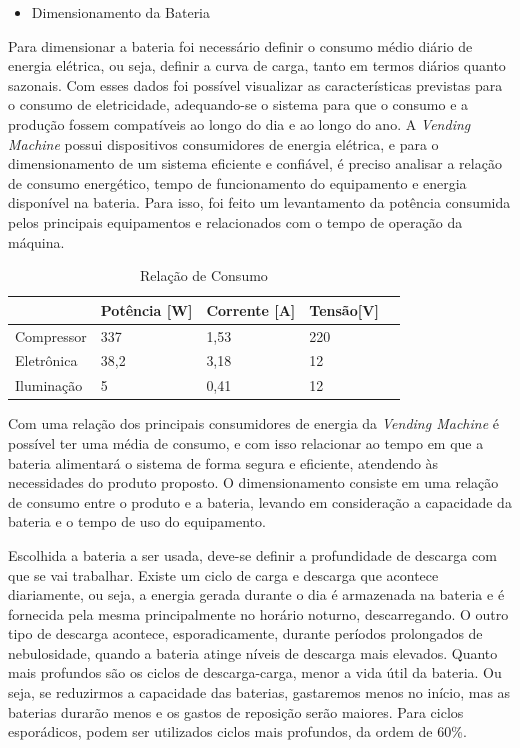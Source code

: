 \newpage

\begin{itemize}
\item Dimensionamento da Bateria
\end{itemize}

Para dimensionar a bateria foi necessário definir o consumo médio diário de energia elétrica, ou seja, definir a curva de carga, tanto em termos diários quanto sazonais. Com esses dados foi possível visualizar as características previstas para o consumo de eletricidade, adequando-se o sistema para que o consumo e a produção fossem compatíveis ao longo do dia e ao longo do ano.
		A \textit{Vending Machine} possui dispositivos consumidores de energia elétrica, e para o dimensionamento de um sistema eficiente e confiável, é preciso analisar a relação de consumo energético, tempo de funcionamento do equipamento e energia disponível na bateria. Para isso, foi feito um levantamento da potência consumida pelos principais equipamentos e relacionados com o tempo de operação da máquina.

\begin{table}[H]
\centering
\caption{Relação de Consumo}
\label{my-label}
\begin{tabular}{|l|l|l|l|l|}
\hline
           & Potência {[}W{]} & Corrente {[}A{]} & Tensão{[}V{]}  \\ \hline
Compressor & 337            & 1,53           & 220           \\ \hline
Eletrônica & 38,2                & 3,18                 &12         \\ \hline
Iluminação & 5            & 0,41            & 12          \\ \hline
\end{tabular}
\end{table}

        Com uma relação dos principais consumidores de energia da \textit{Vending Machine} é possível ter uma média de consumo, e com isso relacionar ao tempo em que a bateria alimentará o sistema de forma segura e eficiente, atendendo às necessidades do produto proposto. O dimensionamento consiste em uma relação de consumo entre o produto e a bateria, levando em consideração a capacidade da bateria e o tempo de uso do equipamento.

		Escolhida a bateria a ser usada, deve-se definir a profundidade de descarga com que se vai trabalhar. Existe um ciclo de carga e descarga que acontece diariamente, ou seja, a energia gerada durante o dia é armazenada na bateria e é fornecida pela mesma principalmente no horário noturno, descarregando. O outro tipo de descarga acontece, esporadicamente, durante períodos prolongados de nebulosidade, quando a bateria atinge níveis de descarga mais elevados.
Quanto mais profundos são os ciclos de descarga-carga, menor a vida útil da bateria. Ou seja, se reduzirmos a capacidade das baterias, gastaremos menos no início, mas as baterias durarão menos e os gastos de reposição serão maiores. Para ciclos esporádicos, podem ser utilizados ciclos mais profundos, da ordem de 60\%.

